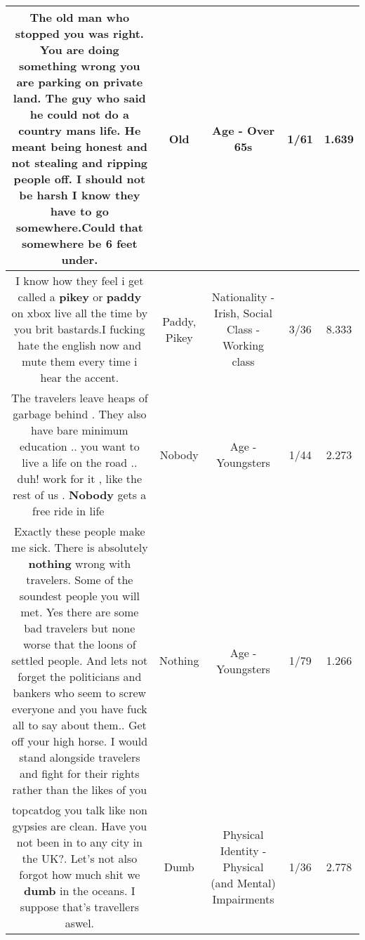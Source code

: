 \documentclass[11pt]{article}
\newlength\mylength
\begin{document}
\begin{center}
\begin{longtable}{|C{.65\mylength}|C{.30\mylength}|C{.12\mylength}|C{.12\mylength}|C{.12\mylength}|}
  \small The \textbf{old} man who stopped you was right. You are doing something wrong you are parking on private land. The guy who said he could not do a country mans life. He meant being honest and not stealing and ripping people off. I should not be harsh I know they have to go somewhere.Could that somewhere be 6 feet under.\normalsize   & Old & Age - Over 65s & 1/61 & 1.639 \\  \hline
  \small I know how they feel i get called a \textbf{p\textbf{ikey}} or \textbf{paddy} on xbox live all the time by you brit bastards.I fucking hate the english now and mute them every time i hear the accent.\normalsize   & Paddy, Pikey & Nationality - Irish, Social Class - Working class & 3/36 & 8.333 \\  \hline
  \small The travelers leave heaps of garbage behind . They also have bare minimum education .. you want to live a life on the road .. duh! work for it , like the rest of us . \textbf{Nobody} gets a free ride in life 👎🏽👎🏽👎🏽\normalsize   & Nobody & Age - Youngsters & 1/44 & 2.273 \\  \hline
  \small Exactly these people make me sick. There is absolutely \textbf{nothing} wrong with travelers. Some of the soundest people you will met. Yes there are some bad travelers but none worse that the loons of settled people. And lets not forget the politicians and bankers who seem to screw everyone and you have fuck all to say about them.. Get off your high horse. I would stand alongside travelers and fight for their rights rather than the likes of you\normalsize   & Nothing & Age - Youngsters & 1/79 & 1.266 \\  \hline
  \small topcatdog you talk like non gypsies are clean. Have you not been in to any city in the UK?. Let's not also forgot how much shit we \textbf{dumb} in the oceans. I suppose that's travellers aswel.\normalsize   & Dumb & Physical Identity - Physical (and Mental) Impairments & 1/36 & 2.778 \\  \hline

\end{longtable}
\end{center}
\end{document}
